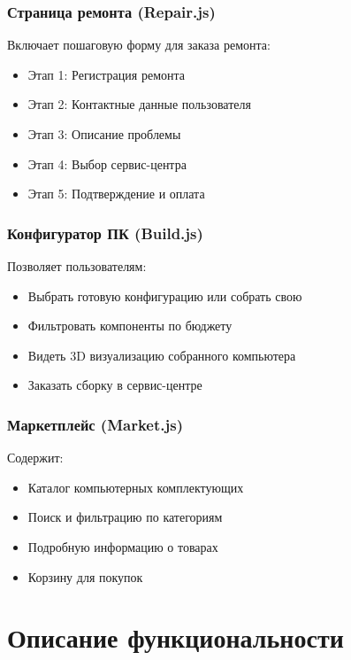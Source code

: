 \documentclass[12pt,a4paper]{report}
\begin{document}
\subsection{Страница ремонта (Repair.js)}
Включает пошаговую форму для заказа ремонта:
\begin{itemize}
    \item Этап 1: Регистрация ремонта
    \item Этап 2: Контактные данные пользователя
    \item Этап 3: Описание проблемы
    \item Этап 4: Выбор сервис-центра
    \item Этап 5: Подтверждение и оплата
\end{itemize}

\subsection{Конфигуратор ПК (Build.js)}
Позволяет пользователям:
\begin{itemize}
    \item Выбрать готовую конфигурацию или собрать свою
    \item Фильтровать компоненты по бюджету
    \item Видеть 3D визуализацию собранного компьютера
    \item Заказать сборку в сервис-центре
\end{itemize}

\subsection{Маркетплейс (Market.js)}
Содержит:
\begin{itemize}
    \item Каталог компьютерных комплектующих
    \item Поиск и фильтрацию по категориям
    \item Подробную информацию о товарах
    \item Корзину для покупок
\end{itemize}

\newpage

\chapter{Описание функциональности}
\end{document}
